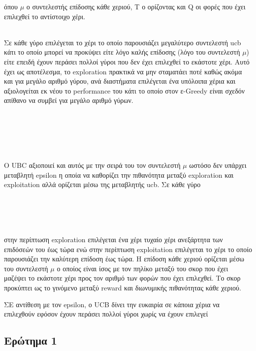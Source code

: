 όπου $\mu$ ο συντελεστής επίδοσης κάθε χεριού, Τ ο ορίζοντας και Q οι φορές που έχει επιλεχθεί το αντίστοιχο χέρι.

\noindent\\
Σε κάθε γύρο επιλέγεται το χέρι το οποίο παρουσιάζει μεγαλύτερο συντελεστή ucb κάτι το οποίο μπορεί να προκύψει είτε λόγο καλής επίδοσης (λόγο του συντελεστή $\mu$) είτε επειδή έχουν περάσει πολλοί γύροι που δεν έχει επιλεχθεί το εκάστοτε χέρι. Αυτό έχει ως αποτέλεσμα, το exploration πρακτικά να μην σταματάει ποτέ καθώς ακόμα και για μεγάλο αριθμό γύρου, ανά διαστήματα επιλέγεται ένα υπόλοιπα χέρια και αξιολογείται εκ νέου το performance του κάτι το οποίο στον ε-Greedy είναι σχεδόν απίθανο να συμβεί για μεγάλο αριθμό γύρων.


\noindent\\\\\\\\\\
O UBC αξιοποιεί και αυτός με την σειρά του τον συντελεστή $\mu$ ωστόσο δεν υπάρχει μεταβλητή epsilon η οποία να καθορίζει την πιθανότητα μεταξύ exploration και exploitation αλλά ορίζεται μέσω της μεταβλητής ucb. Σε κάθε γύρο 




\noindent\\\\\\\\
στην περίπτωση exploration επιλέγεται ένα χέρι τυχαίο χέρι ανεξάρτητα των επιδόσεών του έως τώρα ενώ στην περίπτωση exploitation επιλέγεται το χέρι το οποίο παρουσιάζει την καλύτερη επίδοση έως τώρα. Η επίδοση κάθε χεριού ορίζεται μέσω του συντελεστή $\mu$ ο οποίος είναι ίσος με τον πηλίκο μεταξύ του σκορ που έχει μαζέψει το εκάστοτε χέρι προς τον αριθμό των φορών που έχει επιλεχθεί. Το σκορ προκύπτει ως το γινόμενο μεταξύ reward και διωνυμικής πιθανότητας κάθε χεριού. 



\clearpage


ΣΕ αντίθεση με τον epsilon, ο UCB δίνει την ευκαιρία σε κάποια χέρια να επιλεχθούν εφόσον έχουν περάσει πολλοί γύροι χωρίς να έχουν επιλεγεί


\label{ex1}

\subsection*{Ερώτημα 1}
\label{ex1q1}

